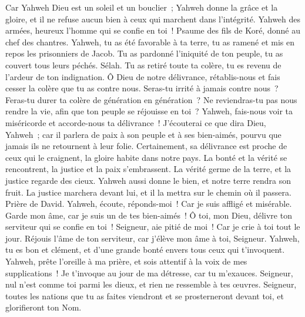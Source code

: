\begin{multicols}{2}
Car Yahweh Dieu est un soleil et un bouclier~; Yahweh donne la grâce et la gloire, et il ne refuse aucun bien à ceux qui marchent dans l'intégrité.
Yahweh des armées, heureux l'homme qui se confie en toi~!
\VerseOne{}Psaume des fils de Koré, donné au chef des chantres.
Yahweh, tu as été favorable à ta terre, tu as ramené et mis en repos les prisonniers de Jacob.
Tu as pardonné l'iniquité de ton peuple, tu as couvert tous leurs péchés. Sélah.
Tu as retiré toute ta colère, tu es revenu de l'ardeur de ton indignation.
Ô Dieu de notre délivrance, rétablis-nous et fais cesser la colère que tu as contre nous.
Seras-tu irrité à jamais contre nous~? Feras-tu durer ta colère de génération en génération~?
Ne reviendras-tu pas nous rendre la vie, afin que ton peuple se réjouisse en toi~?
Yahweh, fais-nous voir ta miséricorde et accorde-nous ta délivrance~!
J'écouterai ce que dira Dieu, Yahweh~; car il parlera de paix à son peuple et à ses bien-aimés, pourvu que jamais ils ne retournent à leur folie.
Certainement, sa délivrance est proche de ceux qui le craignent, la gloire habite dans notre pays.
La bonté et la vérité se rencontrent, la justice et la paix s'embrassent.
La vérité germe de la terre, et la justice regarde des cieux.
Yahweh aussi donne le bien, et notre terre rendra son fruit.
La justice marchera devant lui, et il la mettra sur le chemin où il passera.
\VerseOne{}Prière de David. Yahweh, écoute, réponds-moi~! Car je suis affligé et misérable.
Garde mon âme, car je suis un de tes bien-aimés~! Ô toi, mon Dieu, délivre ton serviteur qui se confie en toi~!
Seigneur, aie pitié de moi~! Car je crie à toi tout le jour.
Réjouis l'âme de ton serviteur, car j'élève mon âme à toi, Seigneur.
Yahweh, tu es bon et clément, et d'une grande bonté envers tous ceux qui t'invoquent.
Yahweh, prête l'oreille à ma prière, et sois attentif à la voix de mes supplications~!
Je t'invoque au jour de ma détresse, car tu m'exauces.
Seigneur, nul n'est comme toi parmi les dieux, et rien ne ressemble à tes œuvres.
Seigneur, toutes les nations que tu as faites viendront et se prosterneront devant toi, et glorifieront ton Nom.

\end{multicols}
